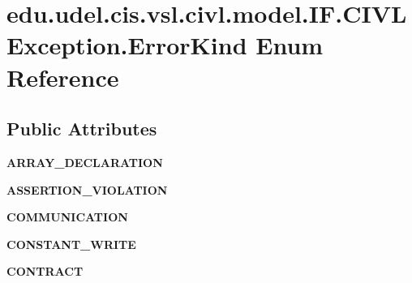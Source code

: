 \hypertarget{enumedu_1_1udel_1_1cis_1_1vsl_1_1civl_1_1model_1_1IF_1_1CIVLException_1_1ErrorKind}{}\section{edu.\+udel.\+cis.\+vsl.\+civl.\+model.\+I\+F.\+C\+I\+V\+L\+Exception.\+Error\+Kind Enum Reference}
\label{enumedu_1_1udel_1_1cis_1_1vsl_1_1civl_1_1model_1_1IF_1_1CIVLException_1_1ErrorKind}
\subsection*{Public Attributes}
\begin{DoxyCompactItemize}
\item 
\hypertarget{enumedu_1_1udel_1_1cis_1_1vsl_1_1civl_1_1model_1_1IF_1_1CIVLException_1_1ErrorKind_ac71dfed701cfc03abd2da075b7398b07}{}{\bfseries A\+R\+R\+A\+Y\+\_\+\+D\+E\+C\+L\+A\+R\+A\+T\+I\+O\+N}\label{enumedu_1_1udel_1_1cis_1_1vsl_1_1civl_1_1model_1_1IF_1_1CIVLException_1_1ErrorKind_ac71dfed701cfc03abd2da075b7398b07}

\item 
\hypertarget{enumedu_1_1udel_1_1cis_1_1vsl_1_1civl_1_1model_1_1IF_1_1CIVLException_1_1ErrorKind_a2dc20415c31c4bb23a4c71671727d3e3}{}{\bfseries A\+S\+S\+E\+R\+T\+I\+O\+N\+\_\+\+V\+I\+O\+L\+A\+T\+I\+O\+N}\label{enumedu_1_1udel_1_1cis_1_1vsl_1_1civl_1_1model_1_1IF_1_1CIVLException_1_1ErrorKind_a2dc20415c31c4bb23a4c71671727d3e3}

\item 
\hypertarget{enumedu_1_1udel_1_1cis_1_1vsl_1_1civl_1_1model_1_1IF_1_1CIVLException_1_1ErrorKind_aa20afc53f6db30281e73d182a2115efe}{}{\bfseries C\+O\+M\+M\+U\+N\+I\+C\+A\+T\+I\+O\+N}\label{enumedu_1_1udel_1_1cis_1_1vsl_1_1civl_1_1model_1_1IF_1_1CIVLException_1_1ErrorKind_aa20afc53f6db30281e73d182a2115efe}

\item 
\hypertarget{enumedu_1_1udel_1_1cis_1_1vsl_1_1civl_1_1model_1_1IF_1_1CIVLException_1_1ErrorKind_a73530e81dc97055a7b571ca4a9bf3d50}{}{\bfseries C\+O\+N\+S\+T\+A\+N\+T\+\_\+\+W\+R\+I\+T\+E}\label{enumedu_1_1udel_1_1cis_1_1vsl_1_1civl_1_1model_1_1IF_1_1CIVLException_1_1ErrorKind_a73530e81dc97055a7b571ca4a9bf3d50}

\item 
\hypertarget{enumedu_1_1udel_1_1cis_1_1vsl_1_1civl_1_1model_1_1IF_1_1CIVLException_1_1ErrorKind_adfff451cfbafda8d1995b805c6d01ea0}{}{\bfseries C\+O\+N\+T\+R\+A\+C\+T}\label{enumedu_1_1udel_1_1cis_1_1vsl_1_1civl_1_1model_1_1IF_1_1CIVLException_1_1ErrorKind_adfff451cfbafda8d1995b805c6d01ea0}


\end{DoxyCompactItemize}
